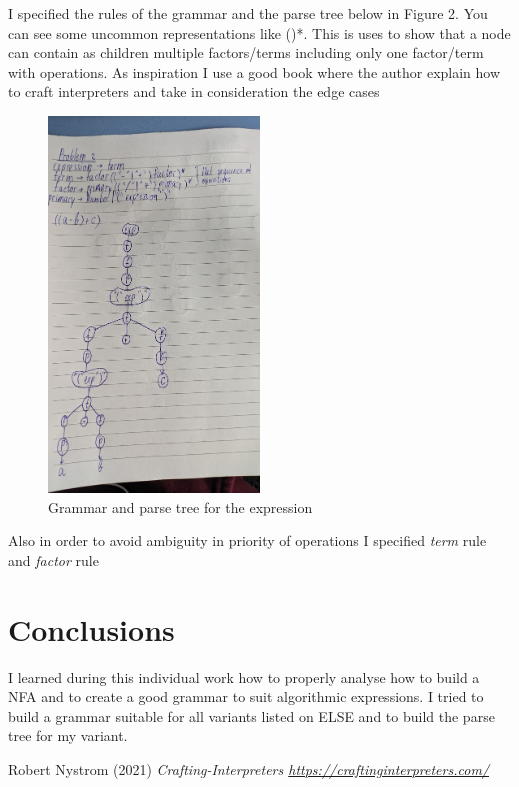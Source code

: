 \documentclass[12pt]{article}
\begin{document}
\clearpage
I specified the rules of the grammar and the parse tree below in Figure 2. You can see some uncommon
representations like ()*. This is uses to show that a node can contain as children multiple
factors/terms including only one factor/term with operations. As inspiration I use a good book where the author 
explain how to craft interpreters and take in consideration the edge 
cases \cite{interpreterref}

\begin{figure}[!h]
\begin{center}
\includegraphics[width=0.5\textwidth]
{problem2.jpg}
\end{center}
\caption{Grammar and parse tree for the expression}
\label{fig:pic2}
\end{figure}

Also in order to avoid ambiguity in priority of operations I specified \textit{term} rule and 
\textit{factor} rule


\section*{Conclusions}
\hspace{0.6cm} 
I learned during this individual work how to properly analyse how to 
build a NFA and to create a good grammar to suit algorithmic expressions. 
I tried to build a grammar suitable for all variants listed on ELSE and 
to build the parse tree for my variant.

\begin{thebibliography}{9}

  Robert Nystrom (2021) \emph{Crafting-Interpreters 
  \href{https://craftinginterpreters.com/parsing-expressions.html}{https://craftinginterpreters.com/}}
\end{thebibliography}
\end{document}
